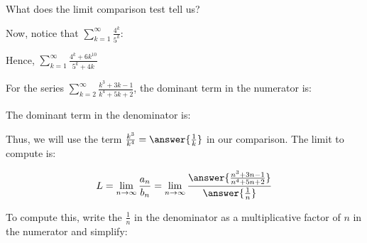 \documentclass{ximera}
\begin{document}
\begin{exercise}
\begin{hint}
\begin{question}
\begin{question}
What does the limit comparison test tell us?

\begin{multipleChoice}
\end{multipleChoice}

Now, notice that $\sum_{k=1}^{\infty} \frac{4^k}{5^k}$:
\begin{multipleChoice}
\end{multipleChoice}

Hence, $\sum_{k=1}^{\infty} \frac{4^k+6k^{10}}{5^k+4k}$
\begin{multipleChoice}
\end{multipleChoice}

\end{question}
\end{question}


\begin{question}
For the series $\sum_{k=2}^{\infty} \frac{k^3+3k-1}{k^4+5k+2}$, the dominant term in the numerator is:

\begin{multipleChoice}
\end{multipleChoice}

The dominant term in the denominator is:

\begin{multipleChoice}
\end{multipleChoice}

Thus, we will use the term $\frac{k^3}{k^4} = \answer{\frac{1}{k}}$ in our comparison.  The limit to compute is:

\[
L = \lim_{n \to \infty} \frac{a_n}{b_n} = \lim_{n \to \infty} \frac{\answer{\frac{n^3+3n-1}{n^4+5n+2} }}{\answer{\frac{1}{n}}}
\]
\begin{question}
To compute this, write the $\frac{1}{n}$ in the denominator as a multiplicative factor of $n$ in the numerator and simplify:


\end{question}
\end{question}
\end{hint}
\end{exercise}
\end{document}
